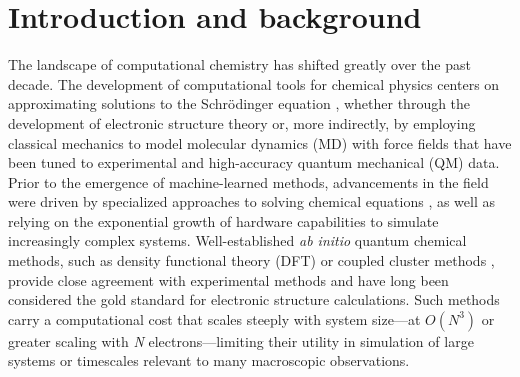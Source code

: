 \chapter{Introduction and background} 

The landscape of computational chemistry has shifted greatly over the past decade. 
The development of computational tools for chemical physics centers on approximating solutions to the Schr{\"o}dinger equation \cite{schrodinger_eqn}, whether through the development of electronic structure theory or, more indirectly, by employing classical mechanics to model molecular dynamics (MD) with force fields that have been tuned to experimental and high-accuracy quantum mechanical (QM) data.
Prior to the emergence of machine-learned methods, advancements in the field were driven by specialized approaches to solving chemical equations \cite{trp_cage_roitberg, dft_qm_mm_roitberg}, 
as well as relying on the exponential growth of hardware capabilities to simulate increasingly complex systems.
Well-established \textit{ab initio} quantum chemical methods, such as density functional theory (DFT) \cite{dft_first_paper, perspective_fifty_years_DFT, wB97X}
or coupled cluster methods \cite{coupled_cluster_first_paper, ccsd(t)_f12, dplno_ccsd(t)*},
provide close agreement with experimental methods and have long been considered the gold standard for electronic structure calculations.
Such methods carry a computational cost that scales steeply with system size---at $O(N^3)$ or greater scaling with \textit{N} electrons---limiting their utility in simulation of large systems or timescales relevant to many macroscopic observations. 

